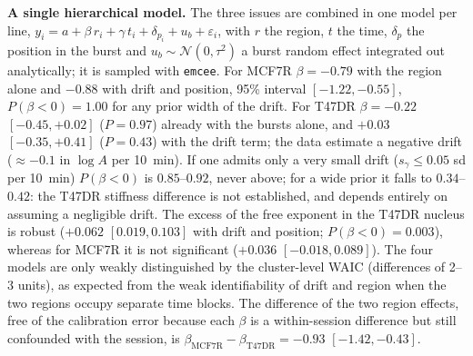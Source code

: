 \documentclass[reprint,nofootinbib,amsmath,amssymb,aps,floatfix]{revtex4-2}
\begin{document}
\textbf{A single hierarchical model.} The three issues are combined in one model per line,
$y_i=a+\beta\,r_i+\gamma\,t_i+\delta_{p_i}+u_b+\varepsilon_i$, with $r$ the region, $t$ the time, $\delta_p$ the position in the burst and $u_b\sim\mathcal N(0,\tau^2)$ a burst random effect integrated out analytically; it is sampled with \texttt{emcee}. For MCF7R $\beta=-0.79$ with the region alone and $-0.88$ with drift and position, 95\% interval $[-1.22,-0.55]$, $P(\beta<0)=1.00$ for any prior width of the drift. For T47DR $\beta=-0.22$ $[-0.45,+0.02]$ ($P=0.97$) already with the bursts alone, and $+0.03$ $[-0.35,+0.41]$ ($P=0.43$) with the drift term; the data estimate a negative drift ($\approx-0.1$ in $\log A$ per 10~min). If one admits only a very small drift ($s_\gamma\le0.05$ sd per 10~min) $P(\beta<0)$ is $0.85$--$0.92$, never above; for a wide prior it falls to $0.34$--$0.42$: the T47DR stiffness difference is not established, and depends entirely on assuming a negligible drift. The excess of the free exponent in the T47DR nucleus is robust ($+0.062$ $[0.019,0.103]$ with drift and position; $P(\beta<0)=0.003$), whereas for MCF7R it is not significant ($+0.036$ $[-0.018,0.089]$). The four models are only weakly distinguished by the cluster-level WAIC (differences of 2--3 units), as expected from the weak identifiability of drift and region when the two regions occupy separate time blocks. The difference of the two region effects, free of the calibration error because each $\beta$ is a within-session difference but still confounded with the session, is $\beta_{\mathrm{MCF7R}}-\beta_{\mathrm{T47DR}}=-0.93$ $[-1.42,-0.43]$.
\end{document}
